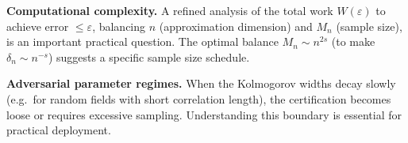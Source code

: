 \documentclass[a4paper,11pt]{article}
\theoremstyle{plain}
\theoremstyle{definition}
\begin{document}
\textbf{Computational complexity.}
A refined analysis of the total work $W(\varepsilon)$ to achieve error $\le\varepsilon$, balancing $n$ (approximation dimension) and $M_n$ (sample size), is an important practical question.
The optimal balance $M_n\sim n^{2s}$ (to make $\delta_n\sim n^{-s}$) suggests a specific sample size schedule.

\textbf{Adversarial parameter regimes.}
When the Kolmogorov widths decay slowly (e.g.\ for random fields with short correlation length), the certification becomes loose or requires excessive sampling.
Understanding this boundary is essential for practical deployment.



\end{document}
